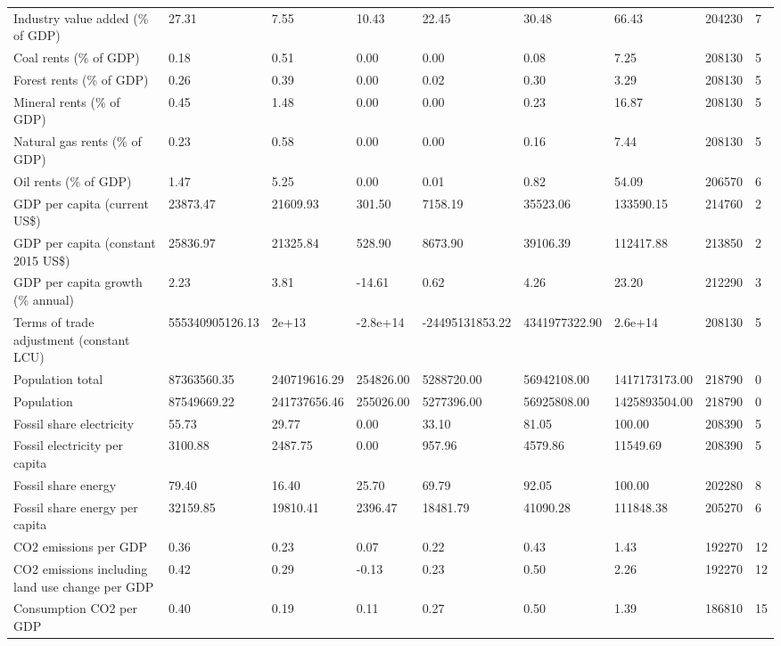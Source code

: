 \begin{longtable}{lllllllll}
Industry value added (\% of GDP) & 27.31 & 7.55 & 10.43 & 22.45 & 30.48 & 66.43 & 204230 & 7\\
Coal rents (\% of GDP) & 0.18 & 0.51 & 0.00 & 0.00 & 0.08 & 7.25 & 208130 & 5\\
Forest rents (\% of GDP) & 0.26 & 0.39 & 0.00 & 0.02 & 0.30 & 3.29 & 208130 & 5\\
\addlinespace
Mineral rents (\% of GDP) & 0.45 & 1.48 & 0.00 & 0.00 & 0.23 & 16.87 & 208130 & 5\\
Natural gas rents (\% of GDP) & 0.23 & 0.58 & 0.00 & 0.00 & 0.16 & 7.44 & 208130 & 5\\
Oil rents (\% of GDP) & 1.47 & 5.25 & 0.00 & 0.01 & 0.82 & 54.09 & 206570 & 6\\
GDP per capita (current US\$) & 23873.47 & 21609.93 & 301.50 & 7158.19 & 35523.06 & 133590.15 & 214760 & 2\\
GDP per capita (constant 2015 US\$) & 25836.97 & 21325.84 & 528.90 & 8673.90 & 39106.39 & 112417.88 & 213850 & 2\\
\addlinespace
GDP per capita growth (\% annual) & 2.23 & 3.81 & -14.61 & 0.62 & 4.26 & 23.20 & 212290 & 3\\
Terms of trade adjustment (constant LCU) & 555340905126.13 & 2e+13 & -2.8e+14 & -24495131853.22 & 4341977322.90 & 2.6e+14 & 208130 & 5\\
Population total & 87363560.35 & 240719616.29 & 254826.00 & 5288720.00 & 56942108.00 & 1417173173.00 & 218790 & 0\\
Population & 87549669.22 & 241737656.46 & 255026.00 & 5277396.00 & 56925808.00 & 1425893504.00 & 218790 & 0\\
Fossil share electricity & 55.73 & 29.77 & 0.00 & 33.10 & 81.05 & 100.00 & 208390 & 5\\
\addlinespace
Fossil electricity per capita & 3100.88 & 2487.75 & 0.00 & 957.96 & 4579.86 & 11549.69 & 208390 & 5\\
Fossil share energy & 79.40 & 16.40 & 25.70 & 69.79 & 92.05 & 100.00 & 202280 & 8\\
Fossil share energy per capita & 32159.85 & 19810.41 & 2396.47 & 18481.79 & 41090.28 & 111848.38 & 205270 & 6\\
CO2 emissions per GDP & 0.36 & 0.23 & 0.07 & 0.22 & 0.43 & 1.43 & 192270 & 12\\
CO2 emissions including land use change per GDP & 0.42 & 0.29 & -0.13 & 0.23 & 0.50 & 2.26 & 192270 & 12\\
\addlinespace
Consumption CO2 per GDP & 0.40 & 0.19 & 0.11 & 0.27 & 0.50 & 1.39 & 186810 & 15\\

\end{longtable}
